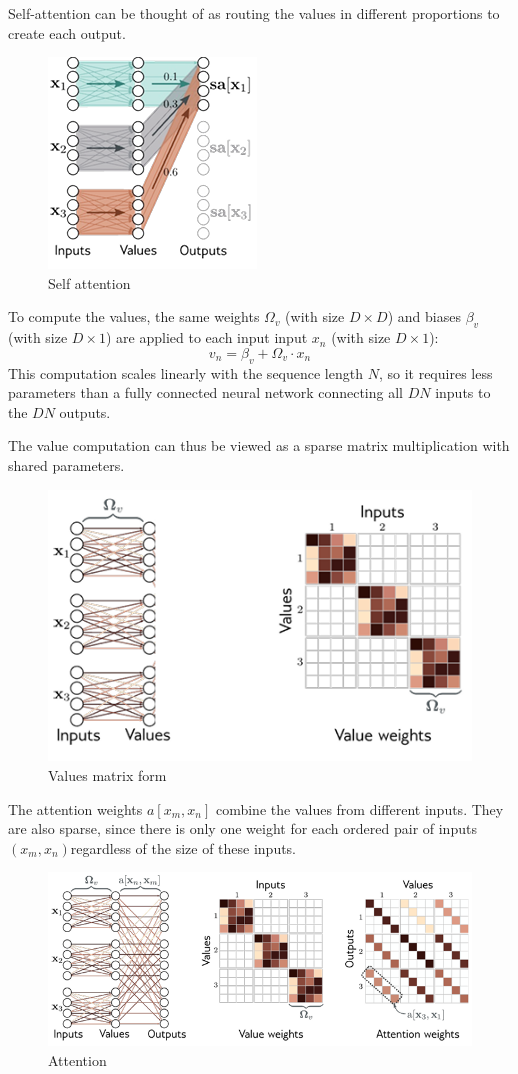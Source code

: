 Self-attention can be thought of as routing the values in different proportions to create each output.
\begin{figure}[!ht]
    \centering
    \includegraphics[width=0.3\linewidth]{img/transformer/selfattention.png}
    \caption{Self attention}
    \label{fig:values}
\end{figure}

To compute the values, the same weights $\Omega_v$ (with size $D \times D$) and biases $\beta_v$ (with size $D \times 1$)
are applied to each input input $x_n$ (with size $D \times 1$):
\begin{equation}
    v_n = \beta_v + \Omega_v \cdot x_n
\end{equation}
This computation scales linearly with the sequence length $N$, so it requires less parameters than a fully connected 
neural network connecting all $DN$ inputs to the $DN$ outputs. 

The value computation can thus be viewed as a sparse matrix multiplication with shared parameters.
\begin{figure}[!ht]
    \centering
    \includegraphics[width=0.5\linewidth]{img/transformer/values.png}
    \caption{Values matrix form}
    \label{fig:enter-label}
\end{figure}

The attention weights $a[x_m, x_n]$ combine the values from different inputs. They are also sparse, since there is only
one weight for each ordered pair of inputs $(x_m, x_n)$regardless of the size of these inputs.

\begin{figure}[!ht]
    \centering
    \includegraphics[width=\linewidth]{img/transformer/attention.png}
    \caption{Attention}
    \label{fig:enter-label}
\end{figure}

